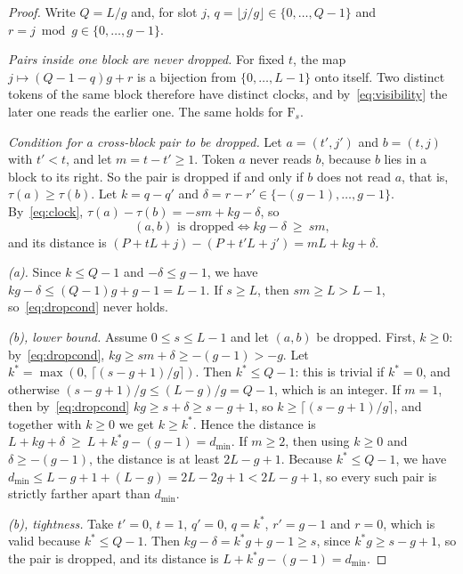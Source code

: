 \documentclass{article}
\theoremstyle{definition}
\theoremstyle{remark}
\newcommand{\Fs}[1]{\mathrm{F}_{#1}}
\newcommand{\dmin}{d_{\min}}
\newcommand{\pos}[1]{\max\!\left(0,\,#1\right)}
\begin{document}
\begin{proof}
Write $Q=L/g$ and, for slot $j$, $q=\lfloor j/g\rfloor\in\{0,\dots,Q-1\}$ and $r=j\bmod g\in\{0,\dots,g-1\}$.

\emph{Pairs inside one block are never dropped.}
For fixed $t$, the map $j\mapsto(Q-1-q)g+r$ is a bijection from $\{0,\dots,L-1\}$ onto itself.
Two distinct tokens of the same block therefore have distinct clocks, and by~\eqref{eq:visibility} the later one reads the earlier one.
The same holds for $\Fs{s}$.

\emph{Condition for a cross-block pair to be dropped.}
Let $a=(t',j')$ and $b=(t,j)$ with $t'<t$, and let $m=t-t'\ge1$.
Token $a$ never reads $b$, because $b$ lies in a block to its right.
So the pair is dropped if and only if $b$ does not read $a$, that is, $\tau(a)\ge\tau(b)$.
Let $k=q-q'$ and $\delta=r-r'\in\{-(g-1),\dots,g-1\}$.
By~\eqref{eq:clock}, $\tau(a)-\tau(b)=-sm+kg-\delta$, so
\begin{equation}
  \text{$(a,b)$ is dropped} \iff kg-\delta\ \ge\ sm,
  \label{eq:dropcond}
\end{equation}
and its distance is $(P+tL+j)-(P+t'L+j') = mL+kg+\delta$.

\emph{(a).}
Since $k\le Q-1$ and $-\delta\le g-1$, we have $kg-\delta\le (Q-1)g+g-1=L-1$.
If $s\ge L$, then $sm\ge L>L-1$, so~\eqref{eq:dropcond} never holds.

\emph{(b), lower bound.}
Assume $0\le s\le L-1$ and let $(a,b)$ be dropped.
First, $k\ge0$: by~\eqref{eq:dropcond}, $kg\ge sm+\delta\ge-(g-1)>-g$.
Let $k^\ast=\pos{\lceil (s-g+1)/g\rceil}$.
Then $k^\ast\le Q-1$: this is trivial if $k^\ast=0$, and otherwise $(s-g+1)/g\le (L-g)/g=Q-1$, which is an integer.
If $m=1$, then by~\eqref{eq:dropcond} $kg\ge s+\delta\ge s-g+1$, so $k\ge\lceil (s-g+1)/g\rceil$, and together with $k\ge0$ we get $k\ge k^\ast$.
Hence the distance is $L+kg+\delta\ \ge\ L+k^\ast g-(g-1)=\dmin$.
If $m\ge2$, then using $k\ge0$ and $\delta\ge-(g-1)$, the distance is at least $2L-g+1$.
Because $k^\ast\le Q-1$, we have $\dmin\le L-g+1+(L-g)=2L-2g+1<2L-g+1$, so every such pair is strictly farther apart than $\dmin$.

\emph{(b), tightness.}
Take $t'=0$, $t=1$, $q'=0$, $q=k^\ast$, $r'=g-1$ and $r=0$, which is valid because $k^\ast\le Q-1$.
Then $kg-\delta=k^\ast g+g-1\ge s$, since $k^\ast g\ge s-g+1$, so the pair is dropped, and its distance is $L+k^\ast g-(g-1)=\dmin$.


\end{proof}
\end{document}

